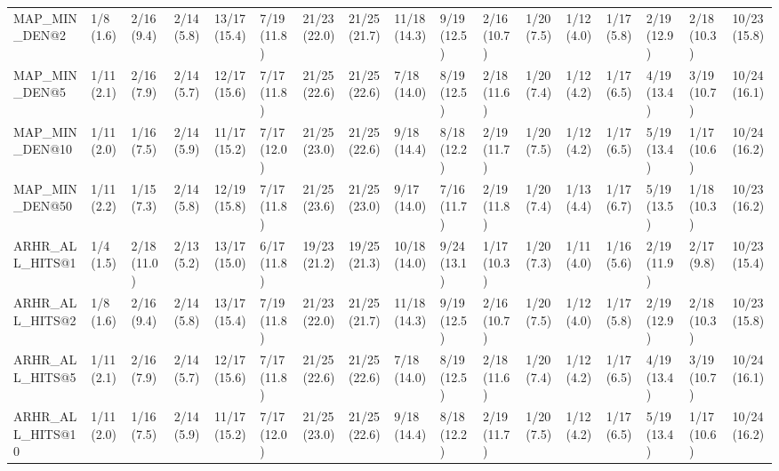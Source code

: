 \begin{tabular}{lllllllllllllllll}
MAP_MIN_DEN@2               &      1/8 (1.6) &     2/16 (9.4) &    2/14 (5.8) &   13/17 (15.4) &    7/19 (11.8) &      21/23 (22.0) &   21/25 (21.7) &  11/18 (14.3) &    9/19 (12.5) &  2/16 (10.7) &  1/20 (7.5) &     1/12 (4.0) &            1/17 (5.8) &         2/19 (12.9) &  2/18 (10.3) &  10/23 (15.8) \\
MAP_MIN_DEN@5               &     1/11 (2.1) &     2/16 (7.9) &    2/14 (5.7) &   12/17 (15.6) &    7/17 (11.8) &      21/25 (22.6) &   21/25 (22.6) &   7/18 (14.0) &    8/19 (12.5) &  2/18 (11.6) &  1/20 (7.4) &     1/12 (4.2) &            1/17 (6.5) &         4/19 (13.4) &  3/19 (10.7) &  10/24 (16.1) \\
MAP_MIN_DEN@10              &     1/11 (2.0) &     1/16 (7.5) &    2/14 (5.9) &   11/17 (15.2) &    7/17 (12.0) &      21/25 (23.0) &   21/25 (22.6) &   9/18 (14.4) &    8/18 (12.2) &  2/19 (11.7) &  1/20 (7.5) &     1/12 (4.2) &            1/17 (6.5) &         5/19 (13.4) &  1/17 (10.6) &  10/24 (16.2) \\
MAP_MIN_DEN@50              &     1/11 (2.2) &     1/15 (7.3) &    2/14 (5.8) &   12/19 (15.8) &    7/17 (11.8) &      21/25 (23.6) &   21/25 (23.0) &   9/17 (14.0) &    7/16 (11.7) &  2/19 (11.8) &  1/20 (7.4) &     1/13 (4.4) &            1/17 (6.7) &         5/19 (13.5) &  1/18 (10.3) &  10/23 (16.2) \\
ARHR_ALL_HITS@1             &      1/4 (1.5) &    2/18 (11.0) &    2/13 (5.2) &   13/17 (15.0) &    6/17 (11.8) &      19/23 (21.2) &   19/25 (21.3) &  10/18 (14.0) &    9/24 (13.1) &  1/17 (10.3) &  1/20 (7.3) &     1/11 (4.0) &            1/16 (5.6) &         2/19 (11.9) &   2/17 (9.8) &  10/23 (15.4) \\
ARHR_ALL_HITS@2             &      1/8 (1.6) &     2/16 (9.4) &    2/14 (5.8) &   13/17 (15.4) &    7/19 (11.8) &      21/23 (22.0) &   21/25 (21.7) &  11/18 (14.3) &    9/19 (12.5) &  2/16 (10.7) &  1/20 (7.5) &     1/12 (4.0) &            1/17 (5.8) &         2/19 (12.9) &  2/18 (10.3) &  10/23 (15.8) \\
ARHR_ALL_HITS@5             &     1/11 (2.1) &     2/16 (7.9) &    2/14 (5.7) &   12/17 (15.6) &    7/17 (11.8) &      21/25 (22.6) &   21/25 (22.6) &   7/18 (14.0) &    8/19 (12.5) &  2/18 (11.6) &  1/20 (7.4) &     1/12 (4.2) &            1/17 (6.5) &         4/19 (13.4) &  3/19 (10.7) &  10/24 (16.1) \\
ARHR_ALL_HITS@10            &     1/11 (2.0) &     1/16 (7.5) &    2/14 (5.9) &   11/17 (15.2) &    7/17 (12.0) &      21/25 (23.0) &   21/25 (22.6) &   9/18 (14.4) &    8/18 (12.2) &  2/19 (11.7) &  1/20 (7.5) &     1/12 (4.2) &            1/17 (6.5) &         5/19 (13.4) &  1/17 (10.6) &  10/24 (16.2) \\

\end{tabular}
